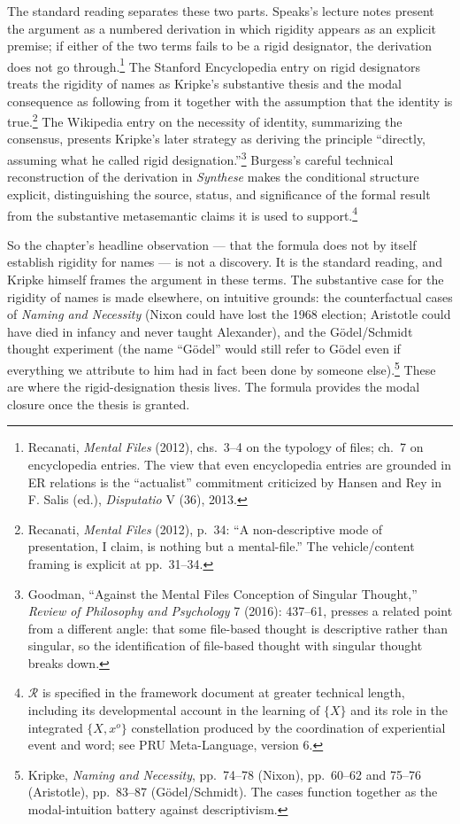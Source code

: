 \documentclass[12pt,a4paper]{article}
\begin{document}
The standard reading separates these two parts. Speaks's lecture notes present the argument as a numbered derivation in which rigidity appears as an explicit premise; if either of the two terms fails to be a rigid designator, the derivation does not go through.\footnote{Recanati, \emph{Mental Files} (2012), chs.~3--4 on the typology of files; ch.~7 on encyclopedia entries. The view that even encyclopedia entries are grounded in ER relations is the ``actualist'' commitment criticized by Hansen and Rey in F. Salis (ed.), \emph{Disputatio} V (36), 2013.} The Stanford Encyclopedia entry on rigid designators treats the rigidity of names as Kripke's substantive thesis and the modal consequence as following from it together with the assumption that the identity is true.\footnote{Recanati, \emph{Mental Files} (2012), p.~34: ``A non-descriptive mode of presentation, I claim, is nothing but a mental-file.'' The vehicle/content framing is explicit at pp.~31--34.} The Wikipedia entry on the necessity of identity, summarizing the consensus, presents Kripke's later strategy as deriving the principle ``directly, assuming what he called rigid designation.''\footnote{Goodman, ``Against the Mental Files Conception of Singular Thought,'' \emph{Review of Philosophy and Psychology} 7 (2016): 437--61, presses a related point from a different angle: that some file-based thought is descriptive rather than singular, so the identification of file-based thought with singular thought breaks down.} Burgess's careful technical reconstruction of the derivation in \emph{Synthese} makes the conditional structure explicit, distinguishing the source, status, and significance of the formal result from the substantive metasemantic claims it is used to support.\footnote{\(\mathcal{R}\) is specified in the framework document at greater technical length, including its developmental account in the learning of \(\{X\}\) and its role in the integrated \(\{X, x^o\}\) constellation produced by the coordination of experiential event and word; see PRU Meta-Language, version 6.}

So the chapter's headline observation --- that the formula does not by itself establish rigidity for names --- is not a discovery. It is the standard reading, and Kripke himself frames the argument in these terms. The substantive case for the rigidity of names is made elsewhere, on intuitive grounds: the counterfactual cases of \emph{Naming and Necessity} (Nixon could have lost the 1968 election; Aristotle could have died in infancy and never taught Alexander), and the Gödel/Schmidt thought experiment (the name ``Gödel'' would still refer to Gödel even if everything we attribute to him had in fact been done by someone else).\footnote{Kripke, \emph{Naming and Necessity}, pp.~74--78 (Nixon), pp.~60--62 and 75--76 (Aristotle), pp.~83--87 (Gödel/Schmidt). The cases function together as the modal-intuition battery against descriptivism.} These are where the rigid-designation thesis lives. The formula provides the modal closure once the thesis is granted.
\end{document}

